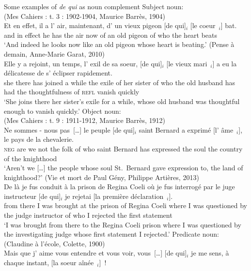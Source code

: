 \ex Some examples of \emph{de qui} as noun complement\label{ex:dq2000-noun}
\ea Subject noun:\\
(Mes Cahiers : t. 3 : 1902-1904, Maurice Barrès, 1904)\\
\gll Et en effet, il a l' air, maintenant, d' un vieux pigeon [de qui]$_i$ [le coeur~\trace{}$_i$] bat.\\
and in effect he has the air now of an old pigeon of who the heart beats\\
\glt `And indeed he looks now like an old pigeon whose heart is beating.'
\label{ex:dq1900-subj}
\ex (Pense à demain, Anne-Marie Garat, 2010)\\
\gll Elle y a rejoint, un temps, l' exil de sa soeur, [de qui]$_i$ [le vieux mari~\trace{}$_i$] a eu la délicatesse de s' éclipser rapidement.\\
she there has joined a while the exile of her sister of who the old husband has had the
thoughtfulness of \textsc{refl} vanish quickly\\
\glt `She joins there her sister's exile for a while, whose old husband was thoughtful enough to vanish quickly.'
\label{ex:dq2000-subj}
\ex Object noun:\\
(Mes Cahiers : t. 9 : 1911-1912, Maurice Barrès, 1912)\\
\gll Ne sommes - nous pas~[\dots] le peuple [de qui]$_i$ saint Bernard a exprimé [l' âme~\trace{}$_i$], le pays de la chevalerie.\\
\textsc{neg} are {} we not the folk of who saint Bernard has expressed the soul the country of the knighthood\\ 
\glt `Aren't we [\dots] the people whose soul St.\ Bernard gave expression to, the land of knighthood?'
\ex (Vie et mort de Paul Gény, Philippe Artières, 2013)\\
\gll De là je fus conduit à la prison de Regina Coeli où je fus interrogé par le juge instructeur [de qui]$_i$ je rejetai [la première déclaration~\trace{}$_i$].\\
from there I was brought at the prison of Regina Coeli where I was questioned by the judge instructor of who I rejected the first statement\\
\glt `I was brought from there to the Regina Coeli prison where I was questioned by the investigating judge whose first statement I rejected.'
\ex Predicate noun:\\
(Claudine à l'école, Colette, 1900)\\
\gll Mais que j' aime vous entendre et vous voir, vous~[\dots] [de qui]$_i$ je me sens, à chaque instant, [la soeur aînée~\trace{}$_i$]~!\\
